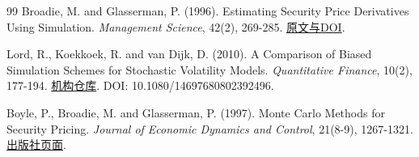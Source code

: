 \documentclass[UTF8,a4paper,zihao=5,fontset=none]{ctexart}
\begin{document}
\begin{thebibliography}{99}
Broadie, M. and Glasserman, P. (1996). Estimating Security Price Derivatives Using Simulation. \emph{Management Science}, 42(2), 269-285. \href{https://pubsonline.informs.org/doi/10.1287/mnsc.42.2.269}{原文与DOI}.

Lord, R., Koekkoek, R. and van Dijk, D. (2010). A Comparison of Biased Simulation Schemes for Stochastic Volatility Models. \emph{Quantitative Finance}, 10(2), 177-194. \href{https://repub.eur.nl/pub/18571}{机构仓库}. DOI: 10.1080/14697680802392496.

Boyle, P., Broadie, M. and Glasserman, P. (1997). Monte Carlo Methods for Security Pricing. \emph{Journal of Economic Dynamics and Control}, 21(8-9), 1267-1321. \href{https://www.sciencedirect.com/science/article/pii/S0165188997000286}{出版社页面}.

\end{thebibliography}\endgroup
\end{document}
